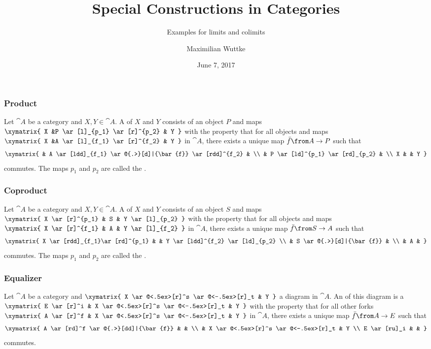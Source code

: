 \documentclass{beamer}
\title{Special Constructions in Categories}
\subtitle{Examples for limits and colimits}
\author{Maximilian Wuttke}
\date{June 7, 2017}
\begin{document}
\frame{\titlepage}

\begin{frame}
  \frametitle{Product}

  Let $\cat{A}$ be a category and $X, Y \in \cat{A}$.
  A  of $X$ and $Y$ consists of an object $P$ and maps \\
  $ \xymatrix{
    X &P \ar[l]_{p_1} \ar[r]^{p_2} & Y
  } $
  with the property that for all objects and maps \\
  $ \xymatrix{
    X &A \ar[l]_{f_1} \ar[r]^{f_2} & Y
  } $
  in $\cat{A}$, there exists a unique map $\bar{f}\from A \to P$ such that
  \[ \xymatrix{
    & A \ar[ldd]_{f_1} \ar@{.>}[d]|{\bar{f}} \ar[rdd]^{f_2} & \\
    & P \ar[ld]^{p_1} \ar[rd]_{p_2} & \\
    X & & Y
  } \]
  commutes. The maps $p_1$ and $p_2$ are called the .

\end{frame}

\begin{frame}
  \frametitle{Coproduct}

  Let $\cat{A}$ be a category and $X, Y \in \cat{A}$.
  A  of $X$ and $Y$ consists of an object $S$ and maps \\
  $ \xymatrix{
    X \ar[r]^{p_1} & S & Y \ar[l]_{p_2}
  } $
  with the property that for all objects and maps \\
  $ \xymatrix{
    X \ar[r]^{f_1} & A & Y \ar[l]_{f_2}
  } $
  in $\cat{A}$, there exists a unique map $\bar{f}\from S \to A$ such that
  \[ \xymatrix{
    X \ar[rdd]_{f_1}\ar[rd]^{p_1} & & Y \ar[ldd]^{f_2} \ar[ld]_{p_2} \\
    & S \ar@{.>}[d]|{\bar{f}} & \\
    & A &
  } \]
  commutes. The maps $p_1$ and $p_2$ are called the .
\end{frame}

\begin{frame}
  \frametitle{Equalizer}

  Let $\cat{A}$ be a category and
  $ \xymatrix{
    X \ar@<.5ex>[r]^s \ar@<-.5ex>[r]_t & Y
  } $
  a diagram in $\cat{A}$.
  An  of this diagram is a  \\
  $ \xymatrix{
    E \ar[r]^i & X \ar@<.5ex>[r]^s \ar@<-.5ex>[r]_t & Y
  } $
  with the property that for all other forks
  $ \xymatrix{
    A \ar[r]^f & X \ar@<.5ex>[r]^s \ar@<-.5ex>[r]_t & Y
  } $
  in $\cat{A}$, there exists a unique map $\bar{f}\from A \to E$ such that
  \[ \xymatrix{
    A \ar[rd]^f \ar@{.>}[dd]|{\bar{f}} & & \\
    & X \ar@<.5ex>[r]^s \ar@<-.5ex>[r]_t & Y \\
    E \ar[ru]_i & &
  } \]
  commutes.
\end{frame}
\end{document}

